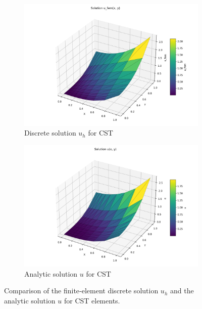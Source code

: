 \begin{figure}[H]
  \centering
  \begin{subfigure}[b]{0.48\textwidth}
    \centering
    \includegraphics[width=\textwidth]{GRAFICOS/CST/CST_u_fem_sol_surface_plot.png}
    \caption{Discrete solution \(u_h\) for CST}
    \label{fig:cst_u_fem_sol}
  \end{subfigure}
  \hfill
  \begin{subfigure}[b]{0.48\textwidth}
    \centering
    \includegraphics[width=\textwidth]{GRAFICOS/CST/CST_u_sol_surface_plot.png}
    \caption{Analytic solution \(u\) for CST}
    \label{fig:cst_error_plot}
  \end{subfigure}
  \caption{Comparison of the finite‐element discrete solution \(u_h\) and the analytic solution \(u\) for CST elements.}
  \label{fig:cst_comparison}
\end{figure}

